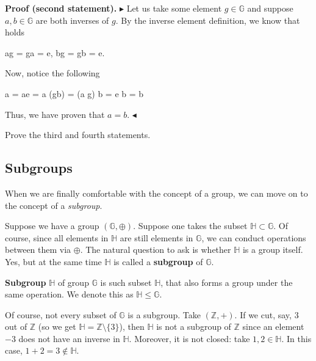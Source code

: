 \documentclass[../lecture-notes-148x210.tex]{subfiles}
\begin{document}
\textbf{Proof (second statement).} 
$\blacktriangleright$ 
Let us take some element $g \in \mathbb{G}$ and suppose $a, b \in \mathbb{G}$ are both inverses of $g$. 
By the inverse element definition, we know that holds
\begin{xequation}
    ag = ga = e, \quad bg = gb = e.
\end{xequation}
Now, notice the following 
\begin{xequation}
    a = ae = a (gb) = (a g) b = e b = b
\end{xequation}
Thus, we have proven that $a = b$.
$\blacktriangleleft$

\begin{exercise}
    Prove the third and fourth statements.
\end{exercise}

\subsection{Subgroups}

When we are finally comfortable with the concept of a group, we can move on to the concept of a \textit{subgroup}. 

Suppose we have a group $(\mathbb{G},\oplus)$. Suppose one takes the subset 
$\mathbb{H} \subset \mathbb{G}$. Of course, since all elements in $\mathbb{H}$ are still 
elements in $\mathbb{G}$, we can conduct operations between them via $\oplus$. 
The natural question to ask is whether $\mathbb{H}$ is a group itself. Yes, but at the same 
time $\mathbb{H}$ is called a \textbf{subgroup} of $\mathbb{G}$.

\begin{definition}
    \textbf{Subgroup} $\mathbb{H}$ of group $\mathbb{G}$ is such subset $\mathbb{H}$, that 
    also forms a group under the same operation.
    We denote this as $\mathbb{H} \leq \mathbb{G}$.
\end{definition}

\begin{example}
    Of course, not every subset of $\mathbb{G}$ is a subgroup. Take $(\mathbb{Z}, +)$. If we cut, say, $3$ out of 
    $\mathbb{Z}$ (so we get $\mathbb{H} = \mathbb{Z} \setminus \{3\}$), then $\mathbb{H}$ is not a subgroup of 
    $\mathbb{Z}$ since an element $-3$ does not have an inverse in $\mathbb{H}$. Moreover, it is not closed: 
    take $1,2 \in \mathbb{H}$. In this case, $1+2 = 3 \notin \mathbb{H}$.
\end{example}
\end{document}
